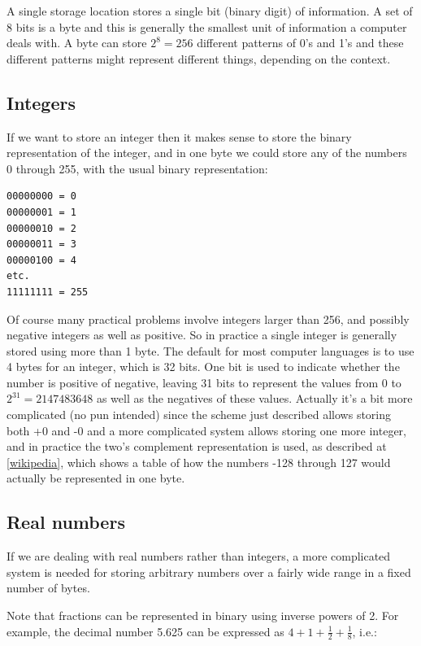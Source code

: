 \documentclass[letterpaper,10pt,english]{sphinxmanual}
\begin{document}
A single storage location stores a single bit (binary digit) of information.
A set of 8 bits is a byte and this is generally the smallest unit of
information a computer deals with.  A byte can store $2^8 = 256$ different
patterns of 0's and 1's and these different patterns might represent
different things, depending on the context.


\subsection{Integers}
\label{memory:integers}
If we want to store an integer
then it makes sense to store the binary representation of the integer, and
in one byte we could store any of the numbers 0 through 255, with the usual
binary representation:

\begin{Verbatim}[commandchars=\\\{\}]
00000000 = 0
00000001 = 1
00000010 = 2
00000011 = 3
00000100 = 4
etc.
11111111 = 255
\end{Verbatim}

Of course many practical problems involve integers larger than 256, and possibly
negative integers as well as positive.  So in practice a single integer is
generally stored using more than 1 byte.  The default for most computer
languages is to use 4 bytes for an integer, which is 32 bits.  One bit is
used to indicate whether the number is positive of negative, leaving 31 bits
to represent the values from 0 to $2^{31} = 2147483648$ as well as the
negatives of these values.  Actually it's a bit more complicated (no pun
intended) since the scheme just described allows storing both +0 and -0  and
a more complicated system allows storing one more integer, and in practice
the two's complement representation is used, as described at
\href{http://en.wikipedia.org/wiki/Two\%27s\_complement}{{[}wikipedia{]}}, which
shows a table of how the numbers -128 through 127 would actually be
represented in one byte.


\subsection{Real numbers}
\label{memory:real-numbers}
If we are dealing with real numbers rather than integers, a more complicated
system is needed for storing arbitrary numbers over a fairly wide range
in a fixed number of bytes.

Note that fractions can be represented in binary using inverse powers of 2.
For example, the decimal number 5.625 can be expressed as
$4+1+\frac 1 2 + \frac 1 8$, i.e.:
\end{document}

